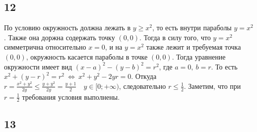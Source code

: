 		\subsection{12}
		По условию окружность должна лежать в $y \geqslant x^2$, то есть внутри параболы $y = x^2$. Также она доржна содержать точку $(0,0)$. Тогда в силу того, что $y = x^2$ симметрична относительно $x = 0$, и на $y = x^2$ также лежит и требуемая точка $(0,0)$, окружность касается параболы в точке $(0,0)$. Тогда уравнение окружности имеет вид $(x - a)^2 - (y - b)^2 = r^2$, где $a = 0,\ b = r$. То есть $x^2 + (y - r)^2 = r^2 \ \Leftrightarrow \ x^2 + y^2 - 2yr = 0$. Откуда $r = \frac{x^2 + y^2}{2y} \leqslant \frac{y + y^2}{2y} = \frac{y + 1}{2}\quad y\in [0; +\infty )$, следовательно $r \leqslant \frac{1}{2}$. Заметим, что при $r = \frac{1}{2}$ требования условия выполнены.
		
		
		\subsection{13}
		